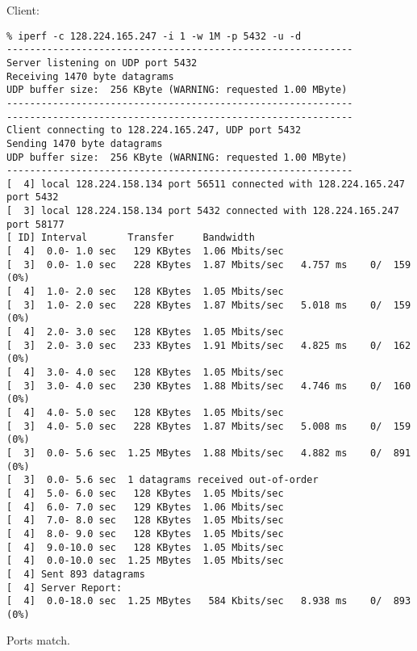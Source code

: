 \documentclass[a4paper]{report}
\begin{document}
Client:
\begin{lstlisting}
% iperf -c 128.224.165.247 -i 1 -w 1M -p 5432 -u -d
------------------------------------------------------------
Server listening on UDP port 5432
Receiving 1470 byte datagrams
UDP buffer size:  256 KByte (WARNING: requested 1.00 MByte)
------------------------------------------------------------
------------------------------------------------------------
Client connecting to 128.224.165.247, UDP port 5432
Sending 1470 byte datagrams
UDP buffer size:  256 KByte (WARNING: requested 1.00 MByte)
------------------------------------------------------------
[  4] local 128.224.158.134 port 56511 connected with 128.224.165.247 port 5432
[  3] local 128.224.158.134 port 5432 connected with 128.224.165.247 port 58177
[ ID] Interval       Transfer     Bandwidth
[  4]  0.0- 1.0 sec   129 KBytes  1.06 Mbits/sec
[  3]  0.0- 1.0 sec   228 KBytes  1.87 Mbits/sec   4.757 ms    0/  159 (0%)
[  4]  1.0- 2.0 sec   128 KBytes  1.05 Mbits/sec
[  3]  1.0- 2.0 sec   228 KBytes  1.87 Mbits/sec   5.018 ms    0/  159 (0%)
[  4]  2.0- 3.0 sec   128 KBytes  1.05 Mbits/sec
[  3]  2.0- 3.0 sec   233 KBytes  1.91 Mbits/sec   4.825 ms    0/  162 (0%)
[  4]  3.0- 4.0 sec   128 KBytes  1.05 Mbits/sec
[  3]  3.0- 4.0 sec   230 KBytes  1.88 Mbits/sec   4.746 ms    0/  160 (0%)
[  4]  4.0- 5.0 sec   128 KBytes  1.05 Mbits/sec
[  3]  4.0- 5.0 sec   228 KBytes  1.87 Mbits/sec   5.008 ms    0/  159 (0%)
[  3]  0.0- 5.6 sec  1.25 MBytes  1.88 Mbits/sec   4.882 ms    0/  891 (0%)
[  3]  0.0- 5.6 sec  1 datagrams received out-of-order
[  4]  5.0- 6.0 sec   128 KBytes  1.05 Mbits/sec
[  4]  6.0- 7.0 sec   129 KBytes  1.06 Mbits/sec
[  4]  7.0- 8.0 sec   128 KBytes  1.05 Mbits/sec
[  4]  8.0- 9.0 sec   128 KBytes  1.05 Mbits/sec
[  4]  9.0-10.0 sec   128 KBytes  1.05 Mbits/sec
[  4]  0.0-10.0 sec  1.25 MBytes  1.05 Mbits/sec
[  4] Sent 893 datagrams
[  4] Server Report:
[  4]  0.0-18.0 sec  1.25 MBytes   584 Kbits/sec   8.938 ms    0/  893 (0%)
\end{lstlisting}
Ports match.
\end{document}
